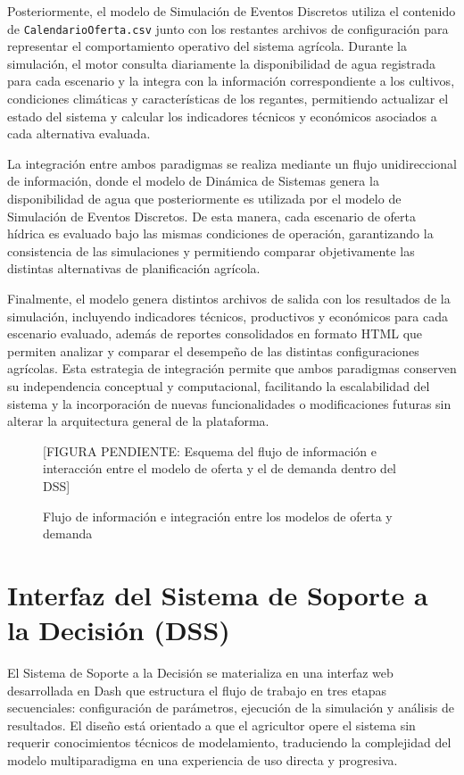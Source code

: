 \documentclass[12pt]{report}
\begin{document}
Posteriormente, el modelo de Simulación de Eventos Discretos utiliza el contenido de \texttt{CalendarioOferta.csv} junto con los restantes archivos de configuración para representar el comportamiento operativo del sistema agrícola. Durante la simulación, el motor consulta diariamente la disponibilidad de agua registrada para cada escenario y la integra con la información correspondiente a los cultivos, condiciones climáticas y características de los regantes, permitiendo actualizar el estado del sistema y calcular los indicadores técnicos y económicos asociados a cada alternativa evaluada.

La integración entre ambos paradigmas se realiza mediante un flujo unidireccional de información, donde el modelo de Dinámica de Sistemas genera la disponibilidad de agua que posteriormente es utilizada por el modelo de Simulación de Eventos Discretos. De esta manera, cada escenario de oferta hídrica es evaluado bajo las mismas condiciones de operación, garantizando la consistencia de las simulaciones y permitiendo comparar objetivamente las distintas alternativas de planificación agrícola.

Finalmente, el modelo genera distintos archivos de salida con los resultados de la simulación, incluyendo indicadores técnicos, productivos y económicos para cada escenario evaluado, además de reportes consolidados en formato HTML que permiten analizar y comparar el desempeño de las distintas configuraciones agrícolas. Esta estrategia de integración permite que ambos paradigmas conserven su independencia conceptual y computacional, facilitando la escalabilidad del sistema y la incorporación de nuevas funcionalidades o modificaciones futuras sin alterar la arquitectura general de la plataforma.

\begin{figure}[H]
    \centering
    \vspace{0.3cm}
    [FIGURA PENDIENTE: Esquema del flujo de información e interacción entre el modelo de oferta y el de demanda dentro del DSS]
    \caption{Flujo de información e integración entre los modelos de oferta y demanda}
    \label{fig:integracion_paradigmas_flujo}
\end{figure}


\section{Interfaz del Sistema de Soporte a la Decisión (DSS)}

El Sistema de Soporte a la Decisión se materializa en una interfaz web desarrollada en Dash que estructura el flujo de trabajo en tres etapas secuenciales: configuración de parámetros, ejecución de la simulación y análisis de resultados. El diseño está orientado a que el agricultor opere el sistema sin requerir conocimientos técnicos de modelamiento, traduciendo la complejidad del modelo multiparadigma en una experiencia de uso directa y progresiva.
\end{document}
